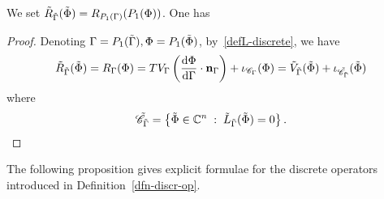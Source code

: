 \begin{prop}
We set $\tilde{R}_{\tilde{\Gamma}}(\tilde{\Phi})= R_{P_1(\Gamma)}(P_1(\Phi))$. One has 
\end{prop}
\begin{proof} 
Denoting $\Gamma=P_1(\tilde{\Gamma}), \Phi=P_1(\tilde{\Phi})$, by~\eqref{defL-discrete}, we have	
$$\tilde{R}_{\tilde{\Gamma}}(\tilde{\Phi}) = R_{\Gamma}(\Phi)= TV_{\Gamma}\left(\frac{\mathrm{d} \Phi}{\mathrm{d} \Gamma}\cdot {\bf n}_{\Gamma} \right)  + \iota_{\mathcal{C}_{\Gamma}}(\Phi) = \tilde{V}_{\tilde{\Gamma}}(\tilde{\Phi})  + \iota_{\tilde{\mathcal{C}}_{\tilde{\Gamma}}}(\tilde{\Phi})$$
where 
$$\tilde{\mathcal{C}}_{\tilde{\Gamma}}=\left\{  \tilde{\Phi} \in \mathbb{C}^n  \;:\;  \tilde{L}_{\tilde{\Gamma}}(\tilde{\Phi})=0  \right\}.$$

\end{proof}

The following proposition gives explicit formulae for the discrete operators introduced in Definition~\ref{dfn-discr-op}.


